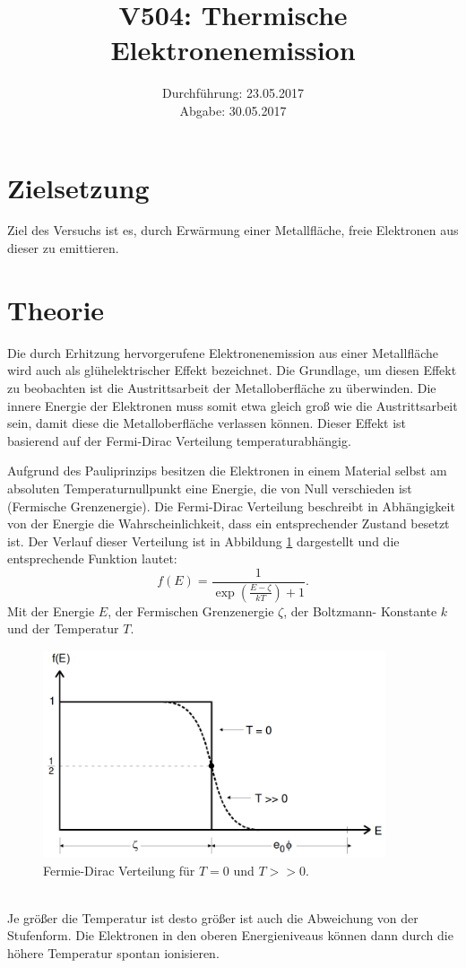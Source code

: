 \documentclass[
  bibliography=totoc,     %
  captions=tableheading,  %
  titlepage=firstiscover, %
]{scrartcl}
\title{V504: Thermische Elektronenemission}
\author{
  Simon Schulte
  \texorpdfstring{
    \\
    \href{mailto:simon.schulte@udo.edu}{simon.schulte@udo.edu}
  }{}
  \texorpdfstring{\and}{, }
  Tim Sedlaczek
  \texorpdfstring{
    \\
    \href{mailto:tim.sedlaczek@udo.edu}{tim.sedlaczek@udo.edu}
  }{}
}
\date{Durchführung: 23.05.2017\\
      Abgabe: 30.05.2017}
\begin{document}
\maketitle
\thispagestyle{empty}
\tableofcontents
\newpage
\setcounter{page}{1}
\section{Zielsetzung}
\label{sec:zielsetzung}
Ziel des Versuchs ist es, durch Erwärmung einer Metallfläche, freie Elektronen aus dieser zu emittieren.
\section{Theorie}
\label{sec:theorie}
Die durch Erhitzung hervorgerufene Elektronenemission aus einer Metallfläche
wird auch als glühelektrischer Effekt bezeichnet. Die Grundlage, um diesen
Effekt zu beobachten ist die Austrittsarbeit der Metalloberfläche zu überwinden.
Die innere Energie der Elektronen muss somit etwa gleich groß wie die
Austrittsarbeit sein, damit diese die Metalloberfläche verlassen können.
Dieser Effekt ist basierend auf der Fermi-Dirac Verteilung temperaturabhängig.

\noindent
Aufgrund des Pauliprinzips besitzen die Elektronen in einem Material selbst
am absoluten Temperaturnullpunkt eine Energie, die von Null verschieden ist
(Fermische Grenzenergie).
Die Fermi-Dirac Verteilung beschreibt in Abhängigkeit von der Energie die
Wahrscheinlichkeit, dass ein entsprechender Zustand besetzt ist.
Der Verlauf dieser Verteilung ist in Abbildung \ref{fig:fermi} dargestellt
und die entsprechende Funktion lautet:
\begin{equation}
  f \left( E \right) = \frac{1}{\exp \left( \frac{E-\zeta}{kT} \right) +1}.
  \label{eqn:fermidirac}
\end{equation}
Mit der Energie $E$, der Fermischen Grenzenergie $\zeta$, der Boltzmann-
Konstante $k$ und der Temperatur $T$.
\begin{figure}[htb]
  \centering
  \includegraphics[width=0.9\textwidth]{V5046.png}
  \caption{Fermie-Dirac Verteilung für $T=0$ und $T>>0$. \cite{anleitung}}
  \label{fig:fermi}
\end{figure}\\
Je größer die Temperatur ist desto größer ist auch die Abweichung von der
Stufenform. Die Elektronen in den oberen Energieniveaus können dann durch
die höhere Temperatur spontan ionisieren.
\end{document}
